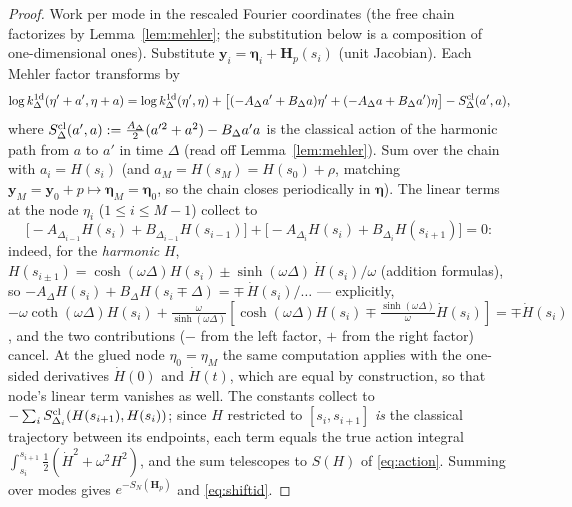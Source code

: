 \documentclass[11pt,a4paper]{article}
\theoremstyle{plain}
\theoremstyle{definition}
\DeclareMathOperator{\ch}{cosh}
\DeclareMathOperator{\sh}{sinh}
\DeclareMathOperator{\cth}{coth}
\begin{document}
\begin{proof}
Work per mode in the rescaled Fourier coordinates (the free chain factorizes
by Lemma~\ref{lem:mehler}; the substitution below is a composition of
one-dimensional ones). Substitute $\bm y_i=\bm\eta_i+\bm H_p(s_i)$ (unit
Jacobian). Each Mehler factor transforms by
\[
 \log k^{\rm 1d}_{\Delta}(\eta'+a',\eta+a)
 =\log k^{\rm 1d}_{\Delta}(\eta',\eta)
 +\bigl[(-A_\Delta a'+B_\Delta a)\eta'
 +(-A_\Delta a+B_\Delta a')\eta\bigr]
 -S^{\rm cl}_\Delta(a',a),
\]
where $S^{\rm cl}_\Delta(a',a):=\tfrac{A_\Delta}2(a'^2+a^2)-B_\Delta a'a$
is the classical action of the harmonic path from $a$ to $a'$ in time
$\Delta$ (read off Lemma~\ref{lem:mehler}). Sum over the chain with
$a_i=H(s_i)$ (and $a_M=H(s_M)=H(s_0)+\rho$, matching
$\bm y_M=\bm y_0+p\mapsto\bm\eta_M=\bm\eta_0$, so the chain closes
periodically in $\bm\eta$). The linear terms at the node $\eta_i$
($1\le i\le M-1$) collect to
\[
 \bigl[-A_{\Delta_{i-1}}H(s_i)+B_{\Delta_{i-1}}H(s_{i-1})\bigr]
 +\bigl[-A_{\Delta_i}H(s_i)+B_{\Delta_i}H(s_{i+1})\bigr]=0 :
\]
indeed, for the \emph{harmonic} $H$, $H(s_{i\pm1})=\ch(\omega\Delta)H(s_i)
\pm\sh(\omega\Delta)\,\dot H(s_i)/\omega$ (addition formulas), so
$-A_\Delta H(s_i)+B_\Delta H(s_i\mp\Delta)
=\mp\,\dot H(s_i)/\!\ldots$ — explicitly,
$-\omega\cth(\omega\Delta)H(s_i)
+\tfrac{\omega}{\sh(\omega\Delta)}
[\ch(\omega\Delta)H(s_i)\mp\tfrac{\sh(\omega\Delta)}\omega\dot H(s_i)]
=\mp\dot H(s_i)$, and the two contributions ($-$ from the left factor,
$+$ from the right factor) cancel. At the glued node $\eta_0=\eta_M$ the same
computation applies with the one-sided derivatives $\dot H(0)$ and
$\dot H(t)$, which are equal by construction, so that node's linear term
vanishes as well. The constants collect to
$-\sum_iS^{\rm cl}_{\Delta_i}(H(s_{i+1}),H(s_i))$; since $H$ restricted to
$[s_i,s_{i+1}]$ \emph{is} the classical trajectory between its endpoints, each
term equals the true action integral
$\int_{s_i}^{s_{i+1}}\tfrac12(\dot H^2+\omega^2H^2)$, and the sum telescopes
to $S(H)$ of \eqref{eq:action}. Summing over modes gives
$e^{-S_N(\bm H_p)}$ and \eqref{eq:shiftid}.
\end{proof}
\end{document}
